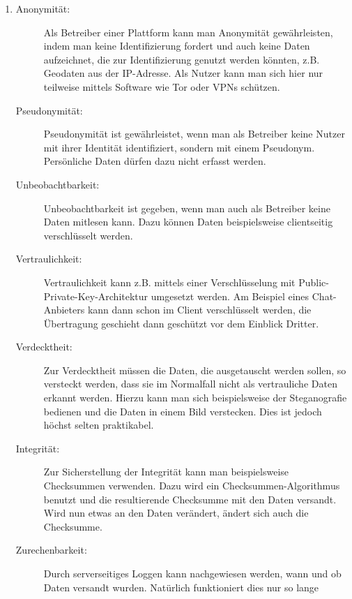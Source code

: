 \documentclass[a4paper,11pt]{scrartcl}
\begin{document}
\begin{enumerate}[1.]
    \item
        \begin{description}
            \item[Anonymität:]
                Als Betreiber einer Plattform kann man Anonymität gewährleisten,
                indem man keine Identifizierung fordert und auch keine Daten
                aufzeichnet, die zur Identifizierung genutzt werden könnten,
                z.B. Geodaten aus der IP-Adresse. Als Nutzer kann man sich hier
                nur teilweise mittels Software wie Tor oder VPNs schützen.
            \item[Pseudonymität:]
                Pseudonymität ist gewährleistet, wenn man als Betreiber keine
                Nutzer mit ihrer Identität identifiziert, sondern mit einem
                Pseudonym. Persönliche Daten dürfen dazu nicht erfasst werden.
            \item[Unbeobachtbarkeit:]
                Unbeobachtbarkeit ist gegeben, wenn man auch als Betreiber
                keine Daten mitlesen kann. Dazu können Daten beispielsweise
                clientseitig verschlüsselt werden.
            \item[Vertraulichkeit:]
                Vertraulichkeit kann z.B. mittels einer Verschlüsselung mit
                Public-Private-Key-Architektur umgesetzt werden. Am Beispiel
                eines Chat-Anbieters kann dann schon im Client verschlüsselt
                werden, die Übertragung geschieht dann geschützt vor dem
                Einblick Dritter.
            \item[Verdecktheit:]
                Zur Verdecktheit müssen die Daten, die ausgetauscht werden sollen,
                so versteckt werden, dass sie im Normalfall nicht als vertrauliche
                Daten erkannt werden. Hierzu kann man sich beispielsweise der
                Steganografie bedienen und die Daten in einem Bild verstecken.
                Dies ist jedoch höchst selten praktikabel.
            \item[Integrität:]
                Zur Sicherstellung der Integrität kann man beispielsweise
                Checksummen verwenden. Dazu wird ein Checksummen-Algorithmus
                benutzt und die resultierende Checksumme mit den Daten versandt.
                Wird nun etwas an den Daten verändert, ändert sich auch die
                Checksumme.
            \item[Zurechenbarkeit:]
                Durch serverseitiges Loggen kann nachgewiesen werden, wann und
                ob Daten versandt wurden. Natürlich funktioniert dies nur so lange

\end{description}
\end{enumerate}
\end{document}
